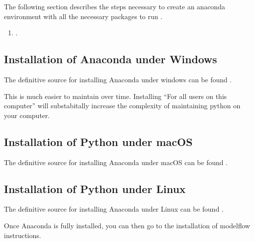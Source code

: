 \documentclass[letterpaper,10pt,english]{jupyterBook}
\begin{document}
\sphinxAtStartPar
The following section describes the steps necessary to create an anaconda environment with all the necessary packages to run .
\begin{enumerate}
%
\item {} 
\sphinxAtStartPar
{}.

\end{enumerate}


\subsection{Installation of Anaconda under Windows}
\label{\detokenize{content/03_Installation/InstallingPython:installation-of-anaconda-under-windows}}
\sphinxAtStartPar
The definitive source for installing Anaconda under windows can be found .

\sphinxAtStartPar
{}  This is much easier to maintain over time.  Installing “For all users on this computer” will substabitally increase the complexity of maintaining python on your computer.


\subsection{Installation of Python under macOS}
\label{\detokenize{content/03_Installation/InstallingPython:installation-of-python-under-macos}}
\sphinxAtStartPar
The definitive source for installing Anaconda under macOS can be found .


\subsection{Installation of Python under Linux}
\label{\detokenize{content/03_Installation/InstallingPython:installation-of-python-under-linux}}
\sphinxAtStartPar
The definitive source for installing Anaconda under Linux can be found .

\sphinxAtStartPar
Once Anaconda is fully installed, you can then go to the installation of modelflow instructions.
\end{document}
